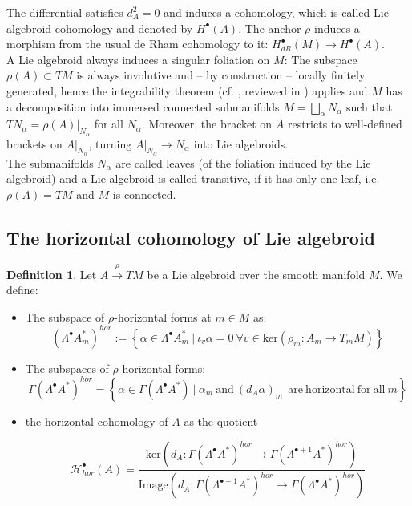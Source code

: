 \documentclass[a4paper,12pt]{amsart}
\theoremstyle{definition}
\newtheorem{Definition}{Definition}[section]
\newcommand{\leaf}[0]{{N}}
\begin{document}
The differential satisfies $d_A^2=0$ and induces a cohomology, which is called Lie algebroid cohomology and denoted by $H^\bullet(A)$. The anchor $\rho$ induces a morphism  {from the usual de Rham cohomology to it:}  $H_{dR}^\bullet(M)\to H^\bullet(A)$.\\

A Lie algebroid always induces a singular foliation on $M$: The subspace $\rho(A)\subset TM$ is always involutive and -- by construction -- locally finitely generated, hence the integrability theorem (cf. \cite{Hermann},   {reviewed in \cite{sylvain}}) applies and $M$ has a decomposition into immersed connected submanifolds $M=\bigsqcup_\alpha \leaf_\alpha$ such that $T\leaf_\alpha=\rho(A)|_{\leaf_\alpha}$ for all $\leaf_\alpha$. Moreover, the bracket on $A$ restricts to well-defined brackets on $A|_{\leaf_\alpha}$, turning $A|_{\leaf_\alpha}\to \leaf_\alpha$ into Lie algebroids.\\ 

The submanifolds $\leaf_\alpha$ are called leaves  (of the foliation induced by the Lie algebroid) and a Lie algebroid is called transitive, if it has only one leaf, i.e. $\rho(A)=TM$ and $M$ is connected.


\subsection{The  {horizontal} cohomology of Lie algebroid}




\begin{Definition}
Let $A\overset{\rho}{\to} TM$ be a Lie algebroid over the smooth manifold $M$. We define:
\begin{itemize}
    \item The subspace of $\rho$-horizontal forms at $m\in M$ as:
    $$(\Lambda^\bullet A_m^*)^{hor}:=\left\{
    \alpha \in \Lambda^\bullet A_m^*~ |~ \iota_v\alpha=0~\forall v\in \mathrm{ker}(\rho_m:A_m\to T_mM) 
    \right\}$$
    \item The subspaces of $\rho$-{horizontal} forms:
  $$  \Gamma(\Lambda^\bullet A^*)^{ {hor}}=\left\{
    \alpha \in  \Gamma(\Lambda^\bullet A^*)~ |~ \alpha_m\mathrm{~and~} (d_A\alpha)_m~\mathrm{~are~horizontal~for~all~}m
    \right\}
    $$
    \item the  {horizontal} cohomology of $A$ as the quotient
    
    $$\mathcal H^\bullet_{{hor}}(A)=\frac{\mathrm{ker}(d_A:  \Gamma(\Lambda^\bullet A^*)^{{hor}}\to  \Gamma(\Lambda^{{\bullet+1}} A^*)^{{hor}})}{\mathrm{Image}(d_A:  \Gamma(\Lambda^{{\bullet-1}} A^*)^{{hor}}\to  \Gamma(\Lambda^\bullet A^*)^{{hor}})}$$
\end{itemize}
\end{Definition}
\end{document}
